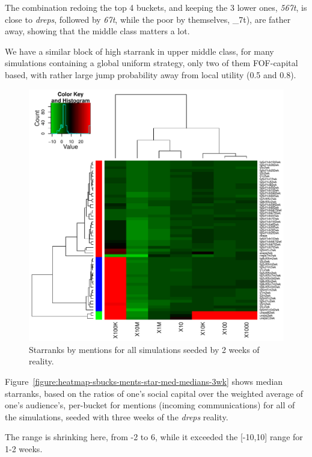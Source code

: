 \documentclass[10pt,oneside]{memoir}
\begin{document}
\begin{Spacing}{2}
The combination redoing the top 4 buckets, and keeping the 3 lower ones, {\itshape 567t}, is close to {\itshape dreps}, followed by {\itshape 67t}, while the poor by themselves, \_7t), are father away, showing that the middle class matters a lot.


We have a similar block of high starrank in upper middle class, for many simulations containing a global uniform strategy, only two of them FOF-capital based, with rather large jump probability away from local utility (0.5 and 0.8).



\begin{figure}
\begin{center}
    \includegraphics{figures/crop/heatmap-sbucks-ments-star-med-medians-2wk}
    \caption{Starranks by mentions for all simulations seeded by 2 weeks of reality.}
    \label{figure:heatmap-sbucks-ments-star-med-medians-2wk}
\end{center}
\end{figure}
Figure~\ref{figure:heatmap-sbucks-ments-star-med-medians-3wk} shows median starranks, based on the ratios of one's social capital over the weighted average of one's audience's, per-bucket for mentions (incoming communications) for all of the simulations, seeded with three weeks of the {\itshape dreps} reality.


The range is shrinking here, from -2 to 6, while it exceeded the [-10,10] range for 1-2 weeks.



\end{Spacing}
\end{document}
